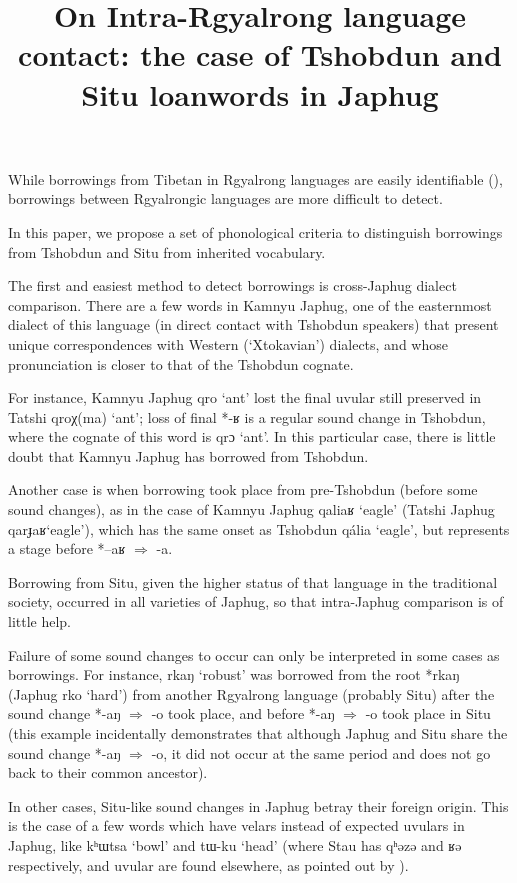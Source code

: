 \documentclass[oldfontcommands,oneside,a4paper,11pt]{article}
\newcommand{\ipa}[1]{{\phon \mbox{#1}}} %
\begin{document}
 
\title{On Intra-Rgyalrong language contact: the case of Tshobdun and Situ loanwords in Japhug }
\maketitle


While borrowings from Tibetan in Rgyalrong languages are easily identifiable (\citealt{jacques04these}), borrowings between Rgyalrongic languages are more difficult to detect. 

In this paper, we propose a set of phonological criteria to distinguish borrowings from Tshobdun and Situ from inherited vocabulary.


The first and easiest method to detect borrowings is cross-Japhug dialect comparison. There are a few words in Kamnyu Japhug, one of the easternmost dialect of this language (in direct contact with Tshobdun speakers) that present unique correspondences with Western (`Xtokavian') dialects, and whose pronunciation is closer to that of the Tshobdun cognate. 

For instance, Kamnyu Japhug \ipa{qro} `ant' lost the final uvular still preserved in Tatshi \ipa{qroχ(ma)} `ant'; loss of final *\ipa{-ʁ} is a regular sound change in Tshobdun, where the cognate of this word is \ipa{qrɔ} `ant'. In this particular case, there is little doubt that Kamnyu Japhug has borrowed from Tshobdun.

Another case is when borrowing took place from pre-Tshobdun (before some sound changes), as in the case of Kamnyu Japhug \ipa{qaliaʁ} `eagle' (Tatshi Japhug \ipa{qarɟaʁ}`eagle'), which has the same onset as  Tshobdun \ipa{qália} `eagle', but represents a stage before *\ipa{--aʁ} $\Rightarrow$ \ipa{-a}.

Borrowing from Situ, given the higher status of that language in the traditional society, occurred in all varieties of Japhug, so that intra-Japhug comparison is of little help.

Failure of some sound changes to occur can only be interpreted in some cases as borrowings. For instance, \ipa{rkaŋ} `robust' was borrowed from the root *\ipa{rkaŋ} (Japhug \ipa{rko} `hard') from another Rgyalrong language (probably Situ) after the sound change *\ipa{-aŋ} $\Rightarrow$ \ipa{-o} took place, and before *\ipa{-aŋ} $\Rightarrow$ \ipa{-o} took place in Situ (this example incidentally demonstrates that although Japhug and Situ share the sound change *\ipa{-aŋ} $\Rightarrow$ \ipa{-o}, it did not occur at the same period and does not go back to their common ancestor).

In other cases, Situ-like sound changes in Japhug betray their foreign origin. This is the case of a few words which have velars instead of expected uvulars in Japhug, like \ipa{kʰɯtsa} `bowl' and \ipa{tɯ-ku} `head' (where Stau has \ipa{qʰəzə} and \ipa{ʁə} respectively, and uvular are found elsewhere, as pointed out by \citealt{gong15uvulars}).


  

\end{document}

